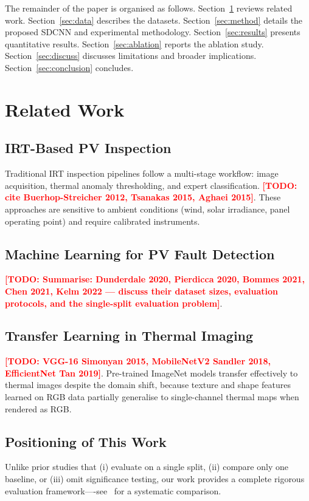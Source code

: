 \documentclass[5p,times,twocolumn]{elsarticle}
\newcommand{\todo}[1]{\textcolor{red}{\textbf{[TODO: #1]}}}
\begin{document}
The remainder of the paper is organised as follows.
Section~\ref{sec:related} reviews related work.
Section~\ref{sec:data} describes the datasets.
Section~\ref{sec:method} details the proposed SDCNN and experimental
methodology.
Section~\ref{sec:results} presents quantitative results.
Section~\ref{sec:ablation} reports the ablation study.
Section~\ref{sec:discuss} discusses limitations and broader implications.
Section~\ref{sec:conclusion} concludes.


\section{Related Work}
\label{sec:related}

\subsection{IRT-Based PV Inspection}
Traditional IRT inspection pipelines follow a multi-stage workflow:
image acquisition, thermal anomaly thresholding, and expert classification.
\todo{cite Buerhop-Streicher 2012, Tsanakas 2015, Aghaei 2015}.
These approaches are sensitive to ambient conditions (wind, solar irradiance,
panel operating point) and require calibrated instruments.

\subsection{Machine Learning for PV Fault Detection}
\todo{Summarise: Dunderdale 2020, Pierdicca 2020, Bommes 2021, Chen 2021,
Kelm 2022 — discuss their dataset sizes, evaluation protocols, and the
single-split evaluation problem}.

\subsection{Transfer Learning in Thermal Imaging}
\todo{VGG-16 Simonyan 2015, MobileNetV2 Sandler 2018, EfficientNet Tan 2019}.
Pre-trained ImageNet models transfer effectively to thermal images despite
the domain shift, because texture and shape features learned on RGB data
partially generalise to single-channel thermal maps when rendered as RGB.

\subsection{Positioning of This Work}
Unlike prior studies that (i) evaluate on a single split, (ii) compare only
one baseline, or (iii) omit significance testing, our work provides a
complete rigorous evaluation framework—-see~
for a systematic comparison.
\end{document}
